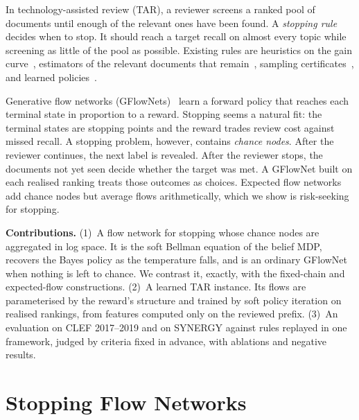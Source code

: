 \documentclass[sigconf,review,anonymous]{acmart}
\begin{document}
In technology-assisted review (TAR), a reviewer screens a ranked pool of documents until enough of the relevant ones have been found. A \emph{stopping rule} decides when to stop. It should reach a target recall on almost every topic while screening as little of the pool as possible. Existing rules are heuristics on the gain curve~\cite{cormack2016engineering,yang2021heuristic}, estimators of the relevant documents that remain~\cite{sneyd2019modelling,stevenson2023point,callaghan2020statistical,li2020stop}, sampling certificates~\cite{lewis2021certifying}, and learned policies~\cite{binhezam2024rlstop}.

Generative flow networks (GFlowNets)~\cite{bengio2021flow,bengio2023foundations,malkin2022trajectory} learn a forward policy that reaches each terminal state in proportion to a reward. Stopping seems a natural fit: the terminal states are stopping points and the reward trades review cost against missed recall. A stopping problem, however, contains \emph{chance nodes}. After the reviewer continues, the next label is revealed. After the reviewer stops, the documents not yet seen decide whether the target was met. A GFlowNet built on each realised ranking treats those outcomes as choices. Expected flow networks~\cite{jiralerspong2024expected} add chance nodes but average flows arithmetically, which we show is risk-seeking for stopping.

\textbf{Contributions.}
(1)~A flow network for stopping whose chance nodes are aggregated in log space. It is the soft Bellman equation of the belief MDP, recovers the Bayes policy as the temperature falls, and is an ordinary GFlowNet when nothing is left to chance. We contrast it, exactly, with the fixed-chain and expected-flow constructions.
(2)~A learned TAR instance. Its flows are parameterised by the reward's structure and trained by soft policy iteration on realised rankings, from features computed only on the reviewed prefix.
(3)~An evaluation on CLEF 2017--2019 and on SYNERGY against rules replayed in one framework, judged by criteria fixed in advance, with ablations and negative results.

\section{Stopping Flow Networks}
\end{document}
